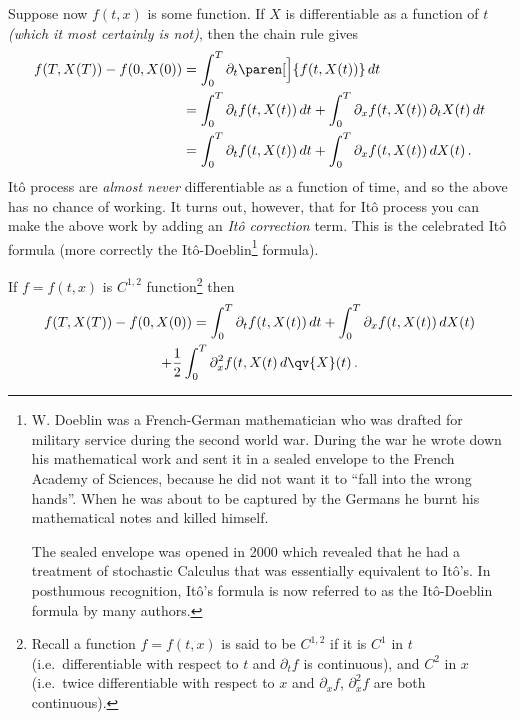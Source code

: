 Suppose now $f(t, x)$ is some function.
If $X$ is differentiable as a function of $t$ \emph{(which it most certainly is not)}, then the chain rule gives
\begin{align*}
  f(T, X(T)) - f(0, X(0))
    &= \int_0^T \partial_t \paren[\Big]{ f(t, X(t)) } \, dt
  \\
    &= \int_0^T \partial_t f( t, X(t)) \, dt
      + \int_0^T \partial_x f( t, X(t) ) \, \partial_t X(t) \, dt
  \\
    &= \int_0^T \partial_t f( t, X(t) ) \, dt
      + \int_0^T \partial_x f(t, X(t) ) \, dX(t)\,.
\end{align*}
It\^o process are \emph{almost never} differentiable as a function of time, and so the above has no chance of working.
It turns out, however, that for It\^o process you can make the above work by adding an \emph{It\^o correction} term.
This is the celebrated It\^o formula (more correctly the It\^o-Doeblin\footnote{%
  W. Doeblin was a French-German mathematician who was drafted for military service during the second world war.
  During the war he wrote down his mathematical work and sent it in a sealed envelope to the French Academy of Sciences, because he did not want it to ``fall into the wrong hands''.
  When he was about to be captured by the Germans he burnt his mathematical notes and killed himself.

  The sealed envelope was opened in 2000 which revealed that he had a treatment of stochastic Calculus that was essentially equivalent to It\^o's.
  In posthumous recognition, It\^o's formula is now referred to as the It\^o-Doeblin formula by many authors.
}
formula).

\begin{theorem}
  If $f = f(t, x)$ is $C^{1,2}$ function\footnote{%
    Recall a function $f = f(t, x)$ is said to be $C^{1,2}$ if it is $C^1$ in $t$ (i.e.\ differentiable with respect to $t$ and $\partial_t f$ is continuous), and $C^2$ in $x$ (i.e.\ twice differentiable with respect to $x$ and $\partial_x f$, $\partial_x^2 f$ are both continuous).
  }
  then
  \begin{multline}\label{e:3ito}
    f(T, X(T)) - f(0, X(0))
      = \int_0^T \partial_t f( t, X(t) ) \, dt
	+ \int_0^T \partial_x f(t, X(t) ) \, dX(t)
    \\
	+ \frac{1}{2} \int_0^T \partial_x^2 f(t, X(t) \, d\qv{X}(t)\,.
  \end{multline}
\end{theorem}

